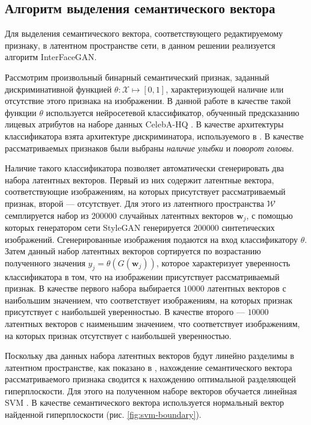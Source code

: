 

\subsection{Алгоритм выделения семантического вектора}

Для выделения семантического вектора, соответствующего редактируемому признаку, в латентном пространстве сети, в данном решении реализуется алгоритм InterFaceGAN.

Рассмотрим произвольный бинарный семантический признак, заданный дискриминативной функцией $\theta : \mathcal X \mapsto [0,1]$, характеризующей наличие или отсутствие этого признака на изображении. 
В данной работе в качестве такой функции $\theta$ используется нейросетевой классификатор, обученный предсказанию лицевых атрибутов на наборе данных CelebA-HQ \cite{liu2015celeba, progressive-growing-gan}.
В качестве архитектуры классификатора взята архитектуре дискриминатора, используемого в \cite{progressive-growing-gan, StyleGAN}. 
В качестве рассматриваемых признаков были выбраны \emph{наличие улыбки} и \emph{поворот головы}.

Наличие такого классификатора позволяет автоматически сгенерировать два набора латентных векторов. Первый из них содержит латентные вектора, соответствующие изображениям, на которых присутствует рассматриваемый признак, второй --- отсутствует.
Для этого из латентного пространства $\mathcal W$ семплируется набор из $200000$ случайных латентных векторов $\mathbf w_j$, с помощью которых генератором сети StyleGAN генерируется $200000$ синтетических изображений.
Сгенерированные изображения подаются на вход классификатору $\theta$. Затем данный набор латентных векторов сортируется по возрастанию полученного значения $ y_j = \theta(G(\mathbf w_j))$, которое характеризует уверенность классификатора в том, что на изображении присутствует рассматриваемый признак.
В качестве первого набора выбирается $10000$ латентных векторов с наибольшим значением, что соответствует изображениям, на которых признак присутствует с наибольшей уверенностью.
В качестве второго --- $10000$ латентных векторов с наименьшим значением, что соответствует изображениям, на которых признак отсутствует с наибольшей уверенностью.

Поскольку два данных набора латентных векторов будут линейно разделимы в латентном пространстве, как показано в \cite{StyleGAN}, нахождение семантического вектора рассматриваемого признака сводится к нахождению оптимальной разделяющей гиперплоскости. 
Для этого на полученном наборе векторов обучается линейная SVM \cite{svm}.
В качестве семантического вектора используется нормальный вектор найденной гиперплоскости (рис. \ref{fig:svm-boundary}).

